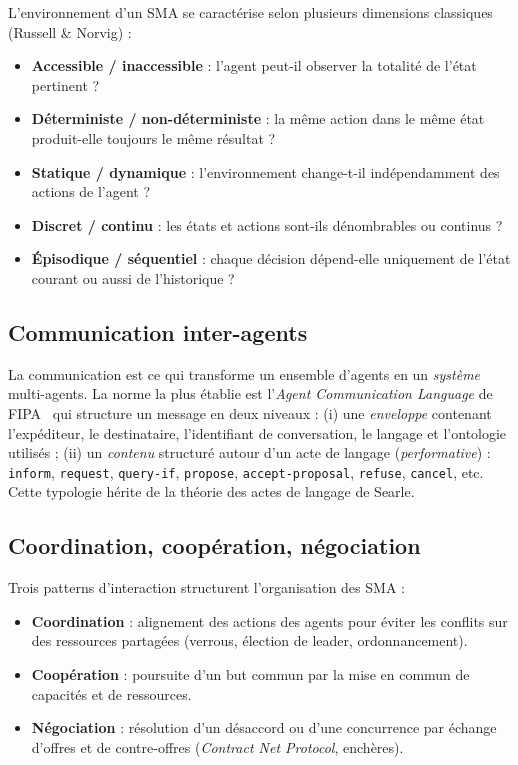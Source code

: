 L'environnement d'un SMA se caractérise selon plusieurs dimensions classiques (Russell \& Norvig) :

\begin{itemize}[leftmargin=*]
    \item \textbf{Accessible / inaccessible} : l'agent peut-il observer la totalité de l'état pertinent ?
    \item \textbf{Déterministe / non-déterministe} : la même action dans le même état produit-elle toujours le même résultat ?
    \item \textbf{Statique / dynamique} : l'environnement change-t-il indépendamment des actions de l'agent ?
    \item \textbf{Discret / continu} : les états et actions sont-ils dénombrables ou continus ?
    \item \textbf{Épisodique / séquentiel} : chaque décision dépend-elle uniquement de l'état courant ou aussi de l'historique ?
\end{itemize}

\subsection{Communication inter-agents}

La communication est ce qui transforme un ensemble d'agents en un \emph{système} multi-agents. La norme la plus établie est l'\emph{Agent Communication Language} de FIPA~\cite{fipa_spec_2002} qui structure un message en deux niveaux : (i) une \emph{enveloppe} contenant l'expéditeur, le destinataire, l'identifiant de conversation, le langage et l'ontologie utilisés ; (ii) un \emph{contenu} structuré autour d'un acte de langage (\emph{performative}) : \texttt{inform}, \texttt{request}, \texttt{query-if}, \texttt{propose}, \texttt{accept-proposal}, \texttt{refuse}, \texttt{cancel}, etc. Cette typologie hérite de la théorie des actes de langage de Searle.

\subsection{Coordination, coopération, négociation}

Trois patterns d'interaction structurent l'organisation des SMA :

\begin{itemize}[leftmargin=*]
    \item \textbf{Coordination} : alignement des actions des agents pour éviter les conflits sur des ressources partagées (verrous, élection de leader, ordonnancement).
    \item \textbf{Coopération} : poursuite d'un but commun par la mise en commun de capacités et de ressources.
    \item \textbf{Négociation} : résolution d'un désaccord ou d'une concurrence par échange d'offres et de contre-offres (\emph{Contract Net Protocol}, enchères).
\end{itemize}

